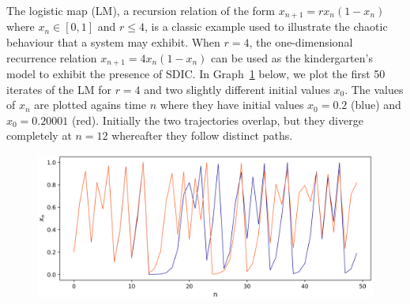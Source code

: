 \begin{Example}\label{ex_LM} \rm
  The logistic map (LM), a recursion relation of the form $x_{n+1}=rx_n(1-x_n)$ where $x_n\in[0,1]$ and $r\leq{4}$, is a classic example used to illustrate the chaotic behaviour that a system may exhibit. When $r=4$, the one-dimensional recurrence relation $x_{n+1}=4x_n(1-x_n)$ can be used as the kindergarten's model to exhibit the presence of SDIC. %
  In Graph~\ref{fig:log_sdic} below, we plot the first 50 iterates of the LM for $r=4$ and two slightly different initial values $x_0$. 
  The values of $x_n$ are plotted agains time $n$  where they have initial values $x_0=0.2$ (blue) and $x_0=0.20001$ (red). Initially the two trajectories overlap, but they diverge completely at $n=12$ whereafter they follow distinct paths.

  \begin{figure}[ht]
    \includegraphics[scale=0.74]{Graphs/_logistic_sdic.eps}
        \centering
   \label{fig:log_sdic}
      \end{figure}
\end{Example}


